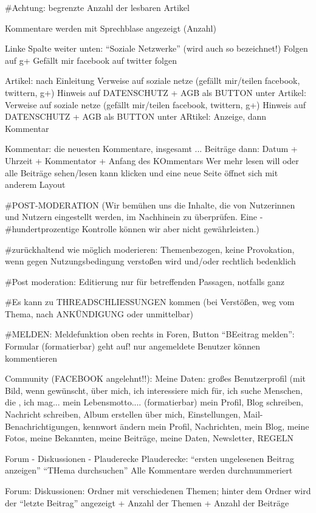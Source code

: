 #Achtung: begrenzte Anzahl der lesbaren Artikel

Kommentare werden mit Sprechblase angezeigt (Anzahl)

Linke Spalte weiter unten: ``Soziale Netzwerke'' (wird auch so bezeichnet!)
Folgen auf g+
Gefällt mir facebook
auf twitter folgen 

Artikel: nach Einleitung Verweise auf soziale netze (gefällt mir/teilen facebook, twittern, g+) 
Hinweis auf DATENSCHUTZ + AGB als BUTTON
unter Artikel: Verweise auf soziale netze (gefällt mir/teilen facebook, twittern, g+) 
Hinweis auf DATENSCHUTZ + AGB als BUTTON
unter ARtikel: Anzeige, dann Kommentar

Kommentar: die neuesten Kommentare, insgesamt ... Beiträge
dann: Datum + Uhrzeit + Kommentator + Anfang des KOmmentars
Wer mehr lesen will oder alle Beiträge sehen/lesen kann klicken und eine neue Seite öffnet sich mit anderem Layout

#POST-MODERATION (Wir bemühen uns die Inhalte, die von Nutzerinnen und Nutzern eingestellt werden, im Nachhinein zu überprüfen. Eine -#hundertprozentige Kontrolle können wir aber nicht gewährleisten.)

#zurückhaltend wie möglich moderieren: Themenbezogen, keine Provokation, wenn gegen Nutzungsbedingung verstoßen wird und/oder rechtlich bedenklich

#Post moderation: Editierung nur für betreffenden Passagen, notfalls ganz

#Es kann zu THREADSCHLIESSUNGEN kommen (bei Verstößen, weg vom Thema, nach ANKÜNDIGUNG oder unmittelbar)

#MELDEN: Meldefunktion oben rechts in Foren, Button ``BEeitrag melden'': Formular (formatierbar) geht auf! nur angemeldete Benutzer können kommentieren

Community (FACEBOOK angelehnt!!): Meine Daten: großes Benutzerprofil (mit Bild, wenn gewünscht, über mich, ich interessiere mich für, ich suche Menschen, die , ich mag... mein Lebensmotto.... (formatierbar)
mein Profil, Blog schreiben, Nachricht schreiben, Album erstellen 
über mich, Einstellungen, Mail-Benachrichtigungen, kennwort ändern
mein Profil, Nachrichten, mein Blog, meine Fotos, meine Bekannten, meine Beiträge, meine Daten, Newsletter, REGELN


Forum - Diskussionen - Plauderecke
Plauderecke:
``ersten ungelesenen Beitrag anzeigen'' ``THema durchsuchen''
Alle Kommentare werden durchnummeriert

Forum: 
Diskussionen: Ordner mit verschiedenen Themen; hinter dem Ordner wird der ``letzte Beitrag'' angezeigt + Anzahl der Themen + Anzahl der Beiträge


